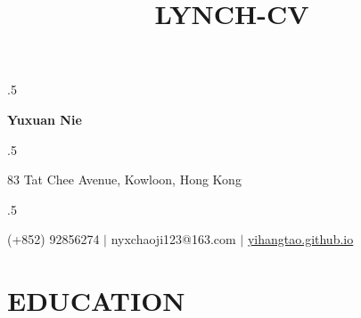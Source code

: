 \documentclass[letterpaper,11pt]{article}
\title{LYNCH-CV}
\begin{document}


\moveleft.5\hoffset\centerline{\LARGE\bf Yuxuan Nie}


 
\moveleft.5\hoffset\centerline{\large 83 Tat Chee Avenue, Kowloon, Hong Kong}
\moveleft.5\hoffset\centerline{\large(+852) 92856274 $|$ nyxchaoji123@163.com $|$ \href{https://Echo-Nie.github.io}{yihangtao.github.io}}



\vspace{1mm}
\section{\textbf{EDUCATION}}
\vspace{1mm}
\end{document}
